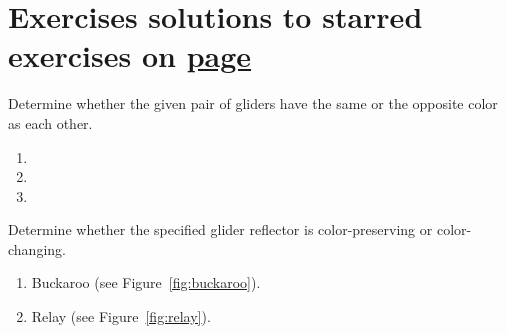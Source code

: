 \section*{Exercises \hfill \normalfont\textsf{\small solutions to starred exercises on \hyperlink{solutions_spaceships}{page \pageref{solutions_spaceships}}}}
\label{sec:spaceships_exercises}
\vspace*{-0.4cm}\hrulefill\vspace*{-0.3cm}\footnotesize\begin{multicols}{2}\vspace*{-0.4cm}\raggedcolumns{}
	\setlength{\parskip}{0pt}
	
	\begin{problemstar}\label{exer:glider_color} 
		Determine whether the given pair of gliders have the same or the opposite color as each other.\vspace*{-0.25cm}
		
		\begin{multicols}{2}
			\begin{enumerate}
				\item[\bf\color{ocre}(a)] 
				
				\item[\bf\color{ocre}(c)] 
				
				\item[\bf\color{ocre}(b)] 
			\end{enumerate}
		\end{multicols}
	\end{problemstar}
	
	
	\mfilbreak
	
	
	\begin{problemstar}\label{exer:reflector_color} 
		Determine whether the specified glider reflector is color-preserving or color-changing.\smallskip
		
		\begin{enumerate}[label=\bf\color{ocre}(\alph*)]
			\item Buckaroo (see Figure~\ref{fig:buckaroo}).
			
			\item Relay (see Figure~\ref{fig:relay}).
			

\end{enumerate}
\end{problemstar}
\end{multicols}
